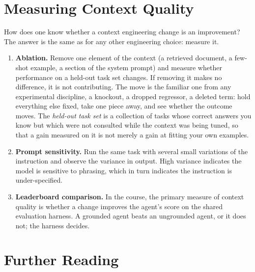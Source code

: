 \section{Measuring Context Quality}
\label{section:ContextQuality}

How does one know whether a context engineering change is an improvement?
The answer is the same as for any other engineering choice: measure it.

\begin{enumerate}
\item \textbf{Ablation.} Remove one element of the context (a retrieved document, a few-shot example, a section of the system prompt) and measure whether performance on a held-out task set changes.
If removing it makes no difference, it is not contributing.
The move is the familiar one from any experimental discipline, a knockout, a dropped regressor, a deleted term: hold everything else fixed, take one piece away, and see whether the outcome moves.
The \emph{held-out task set} is a collection of tasks whose correct answers you know but which were not consulted while the context was being tuned, so that a gain measured on it is not merely a gain at fitting your own examples.

\item \textbf{Prompt sensitivity.} Run the same task with several small variations of the instruction and observe the variance in output.
High variance indicates the model is sensitive to phrasing, which in turn indicates the instruction is under-specified.

\item \textbf{Leaderboard comparison.} In the course, the primary measure of context quality is whether a change improves the agent's score on the shared evaluation harness.
A grounded agent beats an ungrounded agent, or it does not; the harness decides.
\end{enumerate}

\section*{Further Reading}

